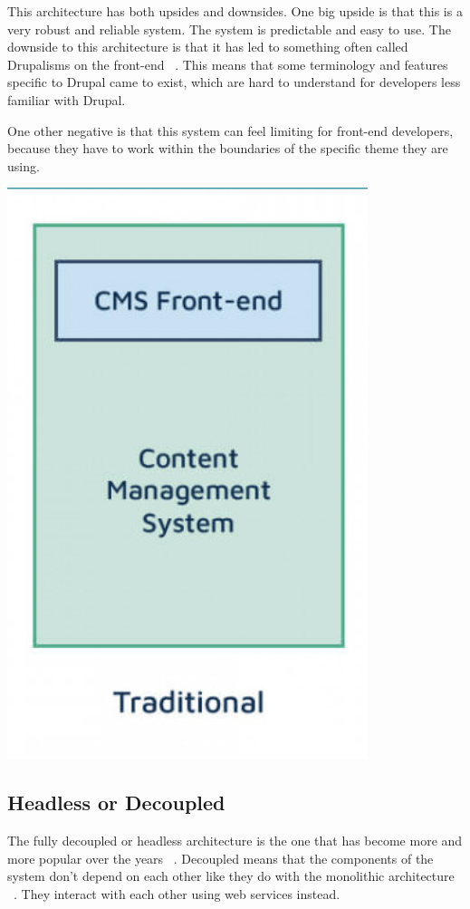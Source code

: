 This architecture has both upsides and downsides. One big upside is that this is a very robust and reliable system. The system is predictable and easy to use. The downside to this architecture is that it has led to something often called Drupalisms on the front-end ~\autocite{So2018}. This means that some terminology and features specific to Drupal came to exist, which are hard to understand for developers less familiar with Drupal. 

One other negative is that this system can feel limiting for front-end developers, because they have to work within the boundaries of the specific theme they are using.

\includegraphics{./img/Traditional_Architecture}

\subsection{Headless or Decoupled}

The fully decoupled or headless architecture is the one that has become more and more popular over the years ~\autocite{Dropsolid2021}. Decoupled means that the components of the system don't depend on each other like they do with the monolithic architecture ~\autocite{So2018}. They interact with each other using web services instead.

